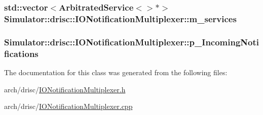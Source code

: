 \hypertarget{class_simulator_1_1drisc_1_1_i_o_notification_multiplexer_a63e8745028e4e013786283ea963cb515}{
\subsubsection[{m\+\_\+services}]{\setlength{\rightskip}{0pt plus 5cm}std\+::vector$<${\bf Arbitrated\+Service}$<$$>$$\ast$$>$ Simulator\+::drisc\+::\+I\+O\+Notification\+Multiplexer\+::m\+\_\+services}}\label{class_simulator_1_1drisc_1_1_i_o_notification_multiplexer_a63e8745028e4e013786283ea963cb515}
\hypertarget{class_simulator_1_1drisc_1_1_i_o_notification_multiplexer_acefe69eb8744c97868986edaa1c5ef2e}{
\subsubsection[{p\+\_\+\+Incoming\+Notifications}]{ Simulator\+::drisc\+::\+I\+O\+Notification\+Multiplexer\+::p\+\_\+\+Incoming\+Notifications}}\label{class_simulator_1_1drisc_1_1_i_o_notification_multiplexer_acefe69eb8744c97868986edaa1c5ef2e}


The documentation for this class was generated from the following files\+:\begin{DoxyCompactItemize}
\item 
arch/drisc/\hyperlink{_i_o_notification_multiplexer_8h}{I\+O\+Notification\+Multiplexer.\+h}\item 
arch/drisc/\hyperlink{_i_o_notification_multiplexer_8cpp}{I\+O\+Notification\+Multiplexer.\+cpp}\end{DoxyCompactItemize}

